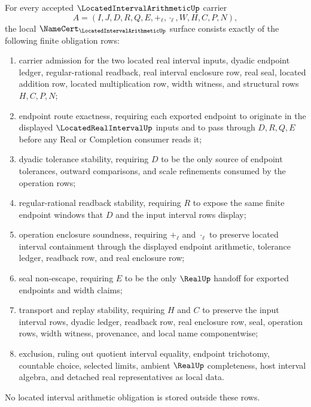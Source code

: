 \begin{theorem}
\label{thm:located-interval-arithmetic-namecert-obligations}
For every accepted $\LocatedIntervalArithmeticUp$ carrier
$$
A=(I,J,D,R,Q,E,+_\ell,\cdot_\ell,W,H,C,P,N),
$$
the local $\NameCert_{\LocatedIntervalArithmeticUp}$ surface consists exactly of the following finite obligation rows:
\begin{enumerate}
\item carrier admission for the two located real interval inputs, dyadic endpoint ledger, regular-rational readback, real interval enclosure row, real seal, located addition row, located multiplication row, width witness, and structural rows $H,C,P,N$;
\item endpoint route exactness, requiring each exported endpoint to originate in the displayed $\LocatedRealIntervalUp$ inputs and to pass through $D,R,Q,E$ before any Real or Completion consumer reads it;
\item dyadic tolerance stability, requiring $D$ to be the only source of endpoint tolerances, outward comparisons, and scale refinements consumed by the operation rows;
\item regular-rational readback stability, requiring $R$ to expose the same finite endpoint windows that $D$ and the input interval rows display;
\item operation enclosure soundness, requiring $+_\ell$ and $\cdot_\ell$ to preserve located interval containment through the displayed endpoint arithmetic, tolerance ledger, readback row, and real enclosure row;
\item seal non-escape, requiring $E$ to be the only $\RealUp$ handoff for exported endpoints and width claims;
\item transport and replay stability, requiring $H$ and $C$ to preserve the input interval rows, dyadic ledger, readback row, real enclosure row, seal, operation rows, width witness, provenance, and local name componentwise;
\item exclusion, ruling out quotient interval equality, endpoint trichotomy, countable choice, selected limits, ambient $\RealUp$ completeness, host interval algebra, and detached real representatives as local data.
\end{enumerate}
No located interval arithmetic obligation is stored outside these rows.
\end{theorem}
